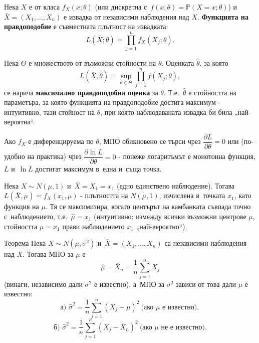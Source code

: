 \begin{defbox}
Нека $X$ е от класа $f_X(x;\theta)$ (или дискретна с~$f(x;\theta)=
\mathbb P(X=x;\theta)$) и~$\bar X=(X_1,\dots,X_n)$ е извадка от
независими наблюдения над $X$. \textbf{Функцията на правдоподобие}
е съвместната плътност на извадката:
\[
  L(\bar X;\theta) = \prod_{j=1}^{n} f_X(X_j;\theta).
\]
\end{defbox}

\begin{defbox}
Нека $\Theta$ е множеството от възможни стойности на $\theta$.
Оценката $\hat\theta$, за която
\[
  L(\bar X,\hat\theta) = \sup_{\theta\in\Theta} \prod_{j=1}^{n} f(X_j;\theta),
\]
се нарича \textbf{максимално правдоподобна оценка} за $\theta$. Т.е.\
$\hat\theta$ е стойността на параметъра, за която функцията на
правдоподобие достига максимум - интуитивно, тази стойност на
$\theta$, при която наблюдаваната извадка би била „най-вероятна“.
\end{defbox}

\begin{rembox}[Логаритмуване]
Ако $f_X$ е диференцируема по $\theta$, МПО обикновено се търси чрез
$\dfrac{\partial L}{\partial\theta}=0$ или (по-удобно на практика)
чрез $\dfrac{\partial\ln L}{\partial\theta}=0$ - понеже логаритъмът е
монотонна функция, $L$ и~$\ln L$ достигат максимум в~една и~съща
точка.
\end{rembox}

\begin{rembox}[Пример: едно наблюдение от \texorpdfstring{$N(\mu,1)$}{N(мю,1)}]
Нека $X\sim N(\mu,1)$ и~$\bar X=X_1=x_1$ (едно единствено
наблюдение). Тогава $L(\bar X,\mu)=f_X(x_1,\mu)$ - плътността на
$N(\mu,1)$, изчислена в~точката $x_1$, като функция на $\mu$. Тя се
максимизира, когато центърът на камбанката съвпада точно с~наблюдението, т.е.\ $\hat\mu=x_1$ (интуитивно: измежду всички
възможни центрове $\mu$, стойността $\mu=x_1$ прави наблюдението
$x_1$ „най-вероятно“).
\end{rembox}

\begin{thmbox}[]{Теорема}
Нека $X\sim N(\mu,\sigma^2)$ и~$\bar X=(X_1,\dots,X_n)$ са
независими наблюдения над $X$. Тогава МПО за $\mu$ е
\[
  \hat\mu = \overline{X}_n = \frac1n\sum_{j=1}^{n} X_j
\]
(винаги, независимо дали $\sigma^2$ е известно), а~МПО за $\sigma^2$
зависи от това дали $\mu$ е известно:
\[
  \text{а) } \hat\sigma^2 = \frac1n\sum_{j=1}^n (X_j-\mu)^2\ \text{(ако $\mu$ е известно)},
\]
\[
  \text{б) } \hat\sigma^2 = \frac1n\sum_{j=1}^n (X_j-\overline X_n)^2\ \text{(ако $\mu$ не е известно)}.
\]
\end{thmbox}

